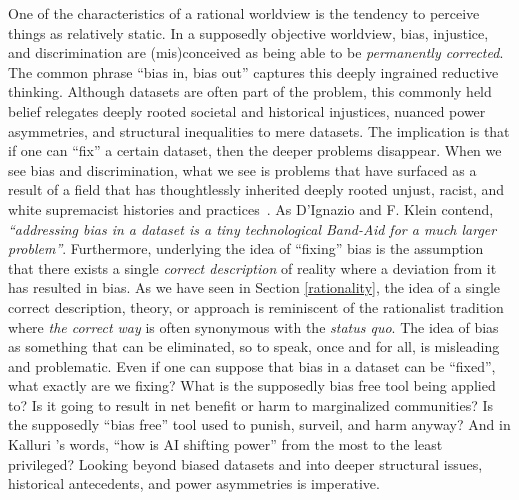 One of the characteristics of a rational worldview is the tendency to perceive things as relatively static. In a supposedly objective worldview, bias, injustice, and discrimination are (mis)conceived as being able to be \textit{permanently corrected}. The common phrase ``bias in, bias out'' captures this deeply ingrained reductive thinking. Although datasets are often part of the problem, this commonly held belief relegates deeply rooted societal and historical injustices, nuanced power asymmetries, and structural inequalities to mere datasets. The implication is that if one can ``fix'' a certain dataset, then the deeper problems disappear. When we see bias and discrimination, what we see is problems that have surfaced as a result of a field that has thoughtlessly inherited deeply rooted unjust, racist, and white supremacist histories and practices~\cite{birhane2021algorithmic}. As D'Ignazio and F. Klein \cite{d2020data} contend, \textit{``addressing bias in a dataset is a tiny technological Band-Aid for a much larger problem''}. Furthermore, underlying the idea of ``fixing'' bias is the assumption that there exists a single \textit{correct description} of reality where a deviation from it has resulted in bias. As we have seen in Section \ref{rationality}, the idea of a single correct description, theory, or approach is reminiscent of the rationalist tradition where \textit{the correct way} is often synonymous with the \textit{status quo}. The idea of bias as something that can be eliminated, so to speak, once and for all, is misleading and problematic. Even if one can suppose that bias in a dataset can be ``fixed'', what exactly are we fixing? What is the supposedly bias free tool being applied to? Is it going to result in net benefit or harm to marginalized communities? Is the supposedly ``bias free'' tool used to punish, surveil, and harm anyway? And in Kalluri \cite{kalluri2020don}'s words, ``how is AI shifting power'' from the most to the least privileged? Looking beyond biased datasets and into deeper structural issues, historical antecedents, and power asymmetries is imperative. 

